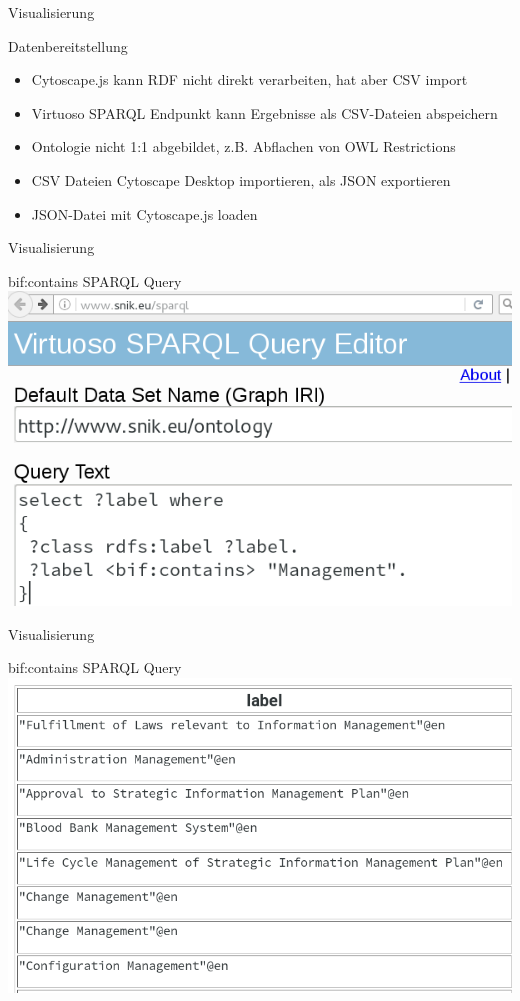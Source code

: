 \documentclass[14pt,aspectratio=1610]{beamer}
\begin{document}
\begin{frame}{Visualisierung}
\begin{block}{Datenbereitstellung}
\begin{itemize}
\item Cytoscape.js kann RDF nicht direkt verarbeiten, hat aber CSV import
\item Virtuoso SPARQL Endpunkt kann Ergebnisse als CSV-Dateien abspeichern
\item Ontologie nicht 1:1 abgebildet, z.B. Abflachen von OWL Restrictions 
\item CSV Dateien Cytoscape Desktop importieren, als JSON exportieren
\item JSON-Datei mit Cytoscape.js loaden
\end{itemize}
\end{block}
\end{frame}

\begin{frame}{Visualisierung}
\begin{block}{bif:contains SPARQL Query}
\centering\includegraphics[width=\textwidth,height=0.7\textheight,keepaspectratio]{img/bifcontains-query.png}
\end{block}
\end{frame}

\begin{frame}{Visualisierung}
\begin{block}{bif:contains SPARQL Query}
\centering\includegraphics[width=\textwidth,height=0.7\textheight,keepaspectratio]{img/bifcontains-result.png}
\end{block}
\end{frame}
\end{document}
